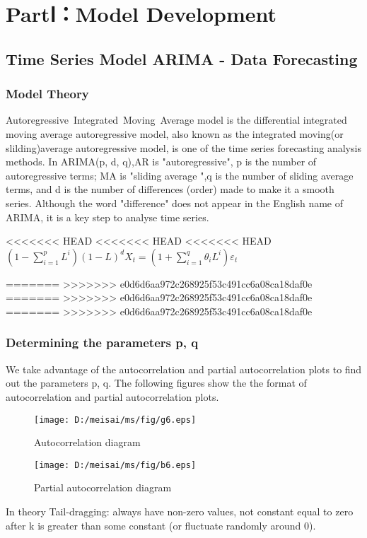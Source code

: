 \documentclass{mcmthesis}
\begin{document}
\section{PartⅠ：Model Development }
\subsection{Time Series Model ARIMA - Data Forecasting }
\subsubsection{Model Theory}
Autoregressive Integrated Moving Average model is the differential integrated moving average autoregressive model, 
also known as the integrated moving(or slilding)average autoregressive model, 
is one of the time series forecasting analysis methods. 
In ARIMA(p, d, q),AR is "autoregressive", p is the number of autoregressive terms;
MA is "sliding average ",q is the number of sliding average terms, and d is the number of differences (order) made to make it a smooth series.
Although the word "difference" does not appear in the English name of ARIMA, it is a key step to analyse time series.

<<<<<<< HEAD
<<<<<<< HEAD
<<<<<<< HEAD
$\left(1-\sum_{i=1}^{p} L^i \right)(1-L)^d X_t=\left(1+\sum_{i=1}^{q}\theta_i L^i \right)\varepsilon_t$

=======
>>>>>>> e0d6d6aa972c268925f53c491cc6a08ca18daf0e
=======
>>>>>>> e0d6d6aa972c268925f53c491cc6a08ca18daf0e
=======
>>>>>>> e0d6d6aa972c268925f53c491cc6a08ca18daf0e
\subsubsection{Determining the parameters p, q }
We take advantage of the autocorrelation and partial autocorrelation plots to find out the parameters p, q.
The following figures show the the format of autocorrelation and partial autocorrelation plots.
\begin{figure}[!h]
  \centering 
  \texttt{[image: D:/meisai/ms/fig/g6.eps]}
  \caption{Autocorrelation diagram}
  \texttt{[image: D:/meisai/ms/fig/b6.eps]}
  \caption{Partial autocorrelation diagram} \label{fig6}
\end{figure}

In theory
Tail-dragging: always have non-zero values, not constant equal to zero after k is greater than some constant (or fluctuate randomly around 0).
\end{document}
